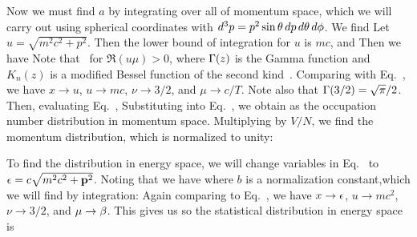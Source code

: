 {	Now we must find $a$ by integrating over all of momentum space, which we will carry out  using spherical coordinates with $\dd[3]{p} = p^2 \sin\theta \dd{p} \dd{\theta} \dd{\phi}$.  We find
	Let $u = \sqrt{m^2 c^2 + p^2}$.  Then the lower bound of integration for $u$ is $m c$, and
	Then we have
	Note that~\cite[p.~351]{Integrals}
	for $\Re(u \mu) > 0$, where $\Gamma(z)$ is the Gamma function and $K_n(z)$ is a modified Bessel function of the second kind~\cite[p.~175]{Pathria}.  Comparing with Eq.~, we have $x \to u$, $u \to mc$, $\nu \to 3/2$, and $\mu \to c/T$.  Note also that $\Gamma(3/2) = \sqrt{\pi} / 2$.  Then, evaluating Eq.~,
	Substituting into Eq.~, we obtain
	as the occupation number distribution in momentum space.  Multiplying by $V / N$, we find the momentum distribution, which is normalized to unity:
	
	To find the distribution in energy space, we will change variables in Eq.~ to $\epsilon = c \sqrt{m^2 c^2 + \vb{p}^2}$.  Noting that
	we have
	where $b$ is a normalization constant,which we will find by integration:
	Again comparing to Eq.~, we have $x \to \epsilon$, $u \to mc^2$, $\nu \to 3/2$, and $\mu \to \beta$.  This gives us
	so the statistical distribution in energy space is

}
